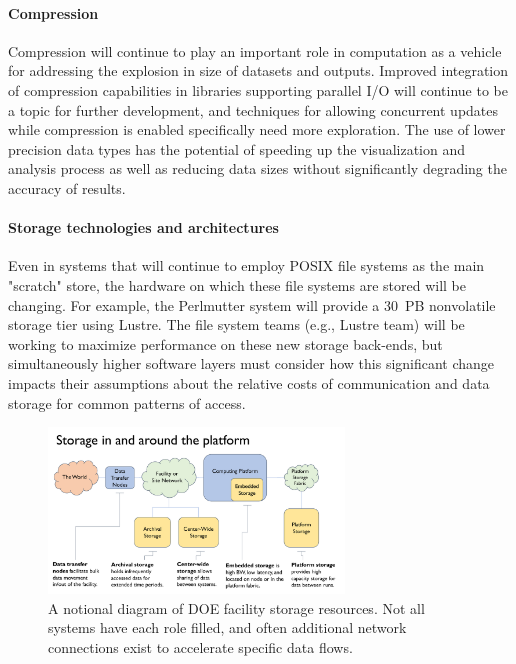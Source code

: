 \paragraph{Compression} Compression will continue to play an important role in computation as a vehicle for addressing the explosion in size of datasets and outputs. Improved integration of compression capabilities in libraries supporting parallel I/O will continue to be a topic for further development, and techniques for allowing concurrent updates while compression is enabled specifically need more exploration.  The use of lower precision data types has the potential of speeding up the visualization and analysis process as well as reducing data sizes without significantly degrading the accuracy of results. 

\paragraph{Storage technologies and architectures} Even in systems that will continue to employ POSIX file systems as the main "scratch" store, the hardware on which these file systems are stored will be changing. For example, the Perlmutter system will provide a 30~PB nonvolatile storage tier using Lustre. The file system teams (e.g., Lustre team) will be working to maximize performance on these new storage back-ends, but simultaneously higher software layers must consider how this significant change impacts their assumptions about the relative costs of communication and data storage for common patterns of access.


\begin{figure}[htb!]
	\centering
	\includegraphics[width=0.70\textwidth]{projects/2.3.4-DataViz/DataViz-storage-notional-diagram.pdf}
	\caption{\label{fig:DataViz:StorageDiagram} A notional diagram of DOE
		facility storage resources. Not all systems have each role filled,
		and often additional network connections exist to accelerate specific
		data flows.}
\end{figure}



